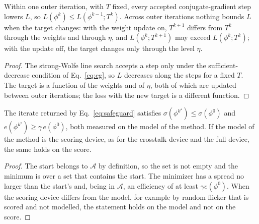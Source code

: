 \begin{proposition}\label{prop:descent}
Within one outer iteration, with $T$ fixed, every accepted conjugate-gradient step lowers $L$, so $L(\phi^k)\le L(\phi^{k-1};T^k)$. Across outer iterations nothing bounds $L$ when the target changes: with the weight update on, $T^{k+1}$ differs from $T^k$ through the weights and through $\eta$, and $L(\phi^k;T^{k+1})$ may exceed $L(\phi^k;T^k)$; with the update off, the target changes only through the level $\eta$.
\end{proposition}
\begin{proof}
The strong-Wolfe line search accepts a step only under the sufficient-decrease condition of Eq.~\ref{eq:cg}, so $L$ decreases along the steps for a fixed $T$. The target is a function of the weights and of $\eta$, both of which are updated between outer iterations; the loss with the new target is a different function.
\end{proof}

\begin{proposition}\label{prop:guard}
The iterate returned by Eq.~\ref{eq:safeguard} satisfies $\sigma(\phi^{k^\star})\le\sigma(\phi^0)$ and $e(\phi^{k^\star})\ge\gamma\,e(\phi^0)$, both measured on the model of the method. If the model of the method is the scoring device, as for the crosstalk device and the full device, the same holds on the score.
\end{proposition}
\begin{proof}
The start belongs to $\mathcal A$ by definition, so the set is not empty and the minimum is over a set that contains the start. The minimizer has a spread no larger than the start's and, being in $\mathcal A$, an efficiency of at least $\gamma e(\phi^0)$. When the scoring device differs from the model, for example by random flicker that is scored and not modelled, the
statement holds on the model and not on the score.
\end{proof}

